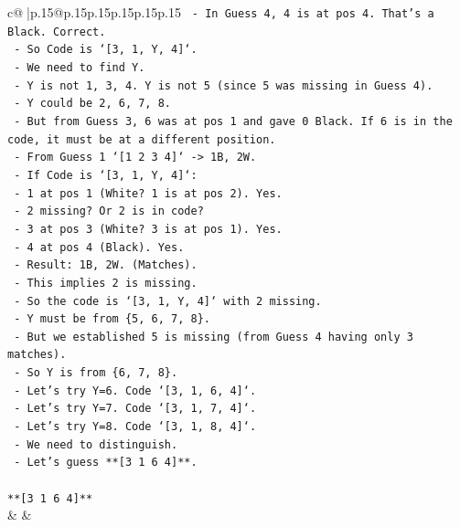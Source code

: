 \documentclass{article}
\begin{document}
{\begin{supertabular}{c@{$\;$}|p{.15\linewidth}@{}p{.15\linewidth}p{.15\linewidth}p{.15\linewidth}p{.15\linewidth}p{.15\linewidth}}
{{{\texttt{          {-} In Guess 4, 4 is at pos 4. That's a Black. Correct.} \\
\texttt{          {-} So Code is `{[}3, 1, Y, 4{]}`.} \\
\texttt{          {-} We need to find Y.} \\
\texttt{          {-} Y is not 1, 3, 4. Y is not 5 (since 5 was missing in Guess 4).} \\
\texttt{          {-} Y could be 2, 6, 7, 8.} \\
\texttt{          {-} But from Guess 3, 6 was at pos 1 and gave 0 Black. If 6 is in the code, it must be at a different position.} \\
\texttt{          {-} From Guess 1 `{[}1 2 3 4{]}` {-}> 1B, 2W.} \\
\texttt{            {-} If Code is `{[}3, 1, Y, 4{]}`:} \\
\texttt{              {-} 1 at pos 1 (White? 1 is at pos 2). Yes.} \\
\texttt{              {-} 2 missing? Or 2 is in code?} \\
\texttt{              {-} 3 at pos 3 (White? 3 is at pos 1). Yes.} \\
\texttt{              {-} 4 at pos 4 (Black). Yes.} \\
\texttt{              {-} Result: 1B, 2W. (Matches).} \\
\texttt{              {-} This implies 2 is missing.} \\
\texttt{          {-} So the code is `{[}3, 1, Y, 4{]}` with 2 missing.} \\
\texttt{          {-} Y must be from \{5, 6, 7, 8\}.} \\
\texttt{          {-} But we established 5 is missing (from Guess 4 having only 3 matches).} \\
\texttt{          {-} So Y is from \{6, 7, 8\}.} \\
\texttt{          {-} Let's try Y=6. Code `{[}3, 1, 6, 4{]}`.} \\
\texttt{          {-} Let's try Y=7. Code `{[}3, 1, 7, 4{]}`.} \\
\texttt{          {-} Let's try Y=8. Code `{[}3, 1, 8, 4{]}`.} \\
\texttt{          {-} We need to distinguish.} \\
\texttt{          {-} Let's guess **{[}3 1 6 4{]}**.} \\
\\ 
\texttt{**{[}3 1 6 4{]}**} \\
            }
        }
    }
    & & \\ \\


\end{supertabular}}
\end{document}
